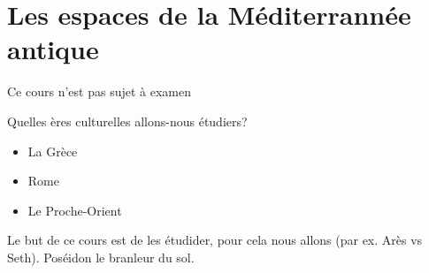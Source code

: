 \section{Les espaces de la Méditerrannée antique}
\begin{framedremark}
Ce cours n'est pas sujet à examen
\end{framedremark}

\begin{parag}{Quelles ères culturelles allons-nous étudiers?}
	\begin{itemize}
		\item La Grèce
		\item Rome
		\item Le Proche-Orient
	\end{itemize}
	Le but de ce cours est de les étudider, pour cela nous allons  (par ex. Arès vs Seth).
	Poséidon le branleur du sol.
	
    
\end{parag}





